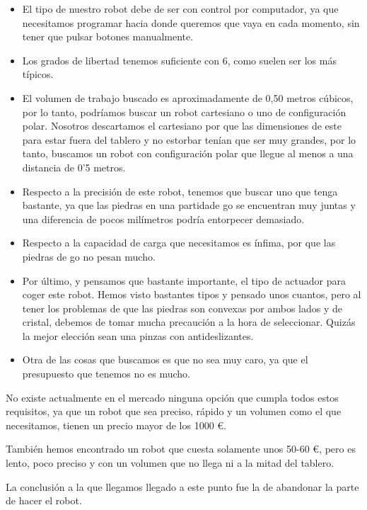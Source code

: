 \documentclass[12pt,a4paper]{report}
\begin{document}
\begin{itemize}
    \item El tipo de nuestro robot debe de ser con control por computador, ya
    que necesitamos programar hacia donde queremos que vaya en cada momento, sin
    tener que pulsar botones manualmente. 
    \item Los grados de libertad tenemos suficiente con 6, como suelen ser los
    más típicos. 
    \item El volumen de trabajo buscado es aproximadamente de 0,50 metros
    cúbicos, por lo tanto, podríamos buscar un robot cartesiano o uno de
    configuración polar. Nosotros descartamos el cartesiano por que las
    dimensiones de este para estar fuera del tablero y no estorbar tenían que
    ser muy grandes, por lo tanto, buscamos un robot con configuración polar que
    llegue al menos a una distancia de 0'5 metros. 
    \item Respecto a la precisión de este robot, tenemos que buscar uno que
    tenga bastante, ya que las piedras en una partidade go se encuentran muy
    juntas y una diferencia de pocos milímetros podría entorpecer demasiado. 
    \item Respecto a la capacidad de carga que necesitamos es ínfima, por que
    las piedras de go no pesan mucho. 
    \item Por último, y pensamos que bastante importante, el tipo de actuador para
    coger este robot. Hemos visto bastantes tipos y pensado unos cuantos, pero
    al tener los problemas de que las piedras son convexas por ambos lados y de
    cristal, debemos de tomar mucha precaución a la hora de seleccionar. Quizás
    la mejor elección sean una pinzas con antideslizantes.
    \item Otra de las cosas que buscamos es que no sea muy caro, ya que el
    presupuesto que tenemos no es mucho. 
\end{itemize}


No existe actualmente en el mercado ninguna opción que cumpla todos estos
requisitos, ya que un robot que sea preciso, rápido y un volumen como el que
necesitamos, tienen un precio mayor de los 1000 \euro.

También hemos encontrado un robot que cuesta solamente unos 50-60 \euro, pero es
lento, poco preciso y con un volumen que no llega ni a la mitad del tablero.

La conclusión a la que llegamos llegado a este punto fue la de abandonar la
parte de hacer el robot. 
\end{document}
